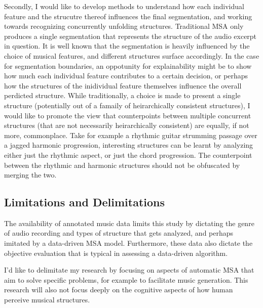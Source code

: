 Secondly, I would like to develop methods to understand how each individual feature and the strucutre thereof influences the final segmentation, and working towards recognizing concurrently unfolding structures. 
Traditional MSA only produces a single segmentation that represents the structure of the audio excerpt in question. 
It is well known that the segmentation is heavily influenced by the choice of musical features, and different structures surface accordingly. 
In the case for segmentation boundaries, an oppotunity for explainability might be to show how much each individual feature contributes to a certain decision, or perhaps how the structures of the inidividual feature themselves influence the overall perdicted structure.
While traditionally, a choice is made to present a single structure (potentially out of a famaily of heirarchically consistent structures), I would like to promote the view that counterpoints between multiple concurrent structures (that are not necessarily heirarchically consistent) are equally, if not more, commonplace. 
Take for example a rhythmic guitar strumming passage over a jagged harmonic progression, interesting structures can be learnt by analyzing either just the rhythmic aspect, or just the chord progression. 
The counterpoint between the rhythmic and harmonic structures should not be obfuscated by merging the two.


\subsection{Limitations and Delimitations}
The availability of annotated music data limits this study by dictating the genre of audio recording and types of structure that gets analyzed, and perhaps imitated by a data-driven MSA model. 
Furthermore, these data also dictate the objective evaluation that is typical in assessing a data-driven algorithm.

I’d like to delimitate my research by focusing on aspects of automatic MSA that aim to solve specific problems, for example to facilitate music generation. 
This research will also not focus deeply on the cognitive aspects of how human perceive musical structures.

